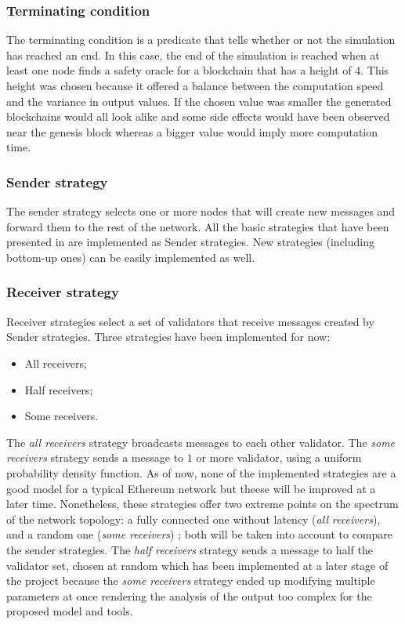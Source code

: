 \subsubsection{Terminating condition}
The terminating condition is a predicate that tells whether or not the simulation has
reached an end. In this case, the end of the simulation is reached when at least
one node finds a safety oracle for a blockchain that has a height of 4. This
height was chosen because it offered a balance between the computation speed and
the variance in output values. If the chosen value was smaller the generated
blockchains would all look alike and some side effects would have been observed
near the genesis block whereas a bigger value would imply more computation time.

\subsubsection{Sender strategy}
The sender strategy selects one or more nodes that will create new messages and
forward them to the rest of the network. All the basic strategies that have been
presented in  are implemented as Sender strategies.
New strategies (including bottom-up ones) can be easily implemented as well.

\subsubsection{Receiver strategy}
Receiver strategies select a set of validators that receive messages created by
Sender strategies. Three strategies have been implemented for now:
\begin{itemize}
        \item All receivers;
        \item Half receivers;
        \item Some receivers.
\end{itemize}

The \textit{all receivers} strategy broadcasts messages to each other validator.
The \textit{some receivers} strategy sends a message to \(1\) or more validator,
using a uniform probability density function.  As of now, none of the
implemented strategies are a good model for a typical Ethereum network but
theese will be improved at a later time.  Nonetheless, these strategies offer
two extreme points on the spectrum of the network topology: a fully connected
one without latency (\textit{all receivers}), and a random one (\textit{some
receivers}) ; both will be taken into account to compare the sender
strategies.
The \textit{half receivers} strategy sends a message to half the validator set,
chosen at random which has been implemented at a later stage of the project
because the \textit{some receivers} strategy ended up modifying multiple
parameters at once rendering the analysis of the output too complex for the
proposed model and tools.

